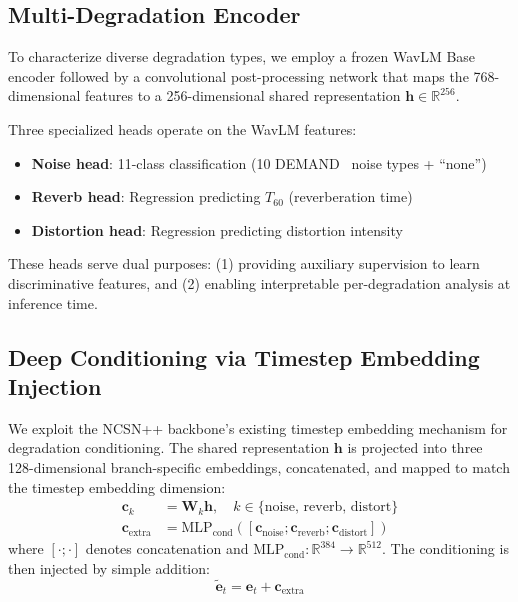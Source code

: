 \documentclass[cameraready]{Interspeech}
\begin{document}
\subsection{Multi-Degradation Encoder}

To characterize diverse degradation types, we employ a frozen WavLM Base~\cite{chen2022wavlm} encoder followed by a convolutional post-processing network that maps the 768-dimensional features to a 256-dimensional shared representation $\mathbf{h} \in \mathbb{R}^{256}$.

Three specialized heads operate on the WavLM features:
\begin{itemize}
\item \textbf{Noise head}: 11-class classification (10 DEMAND~\cite{thiemann2013demand} noise types + ``none'')
\item \textbf{Reverb head}: Regression predicting $T_{60}$ (reverberation time)
\item \textbf{Distortion head}: Regression predicting distortion intensity
\end{itemize}
These heads serve dual purposes: (1) providing auxiliary supervision to learn discriminative features, and (2) enabling interpretable per-degradation analysis at inference time.


\subsection{Deep Conditioning via Timestep Embedding Injection}

We exploit the NCSN++ backbone's existing timestep embedding mechanism for degradation conditioning.
The shared representation $\mathbf{h}$ is projected into three 128-dimensional branch-specific embeddings, concatenated, and mapped to match the timestep embedding dimension:
\begin{align}
\mathbf{c}_k &= \mathbf{W}_k \mathbf{h}, \quad k \in \{\text{noise, reverb, distort}\} \label{eq:branch} \\
\mathbf{c}_\text{extra} &= \text{MLP}_\text{cond}([\mathbf{c}_\text{noise}; \mathbf{c}_\text{reverb}; \mathbf{c}_\text{distort}]) \label{eq:mlp}
\end{align}
where $[\cdot;\cdot]$ denotes concatenation and $\text{MLP}_\text{cond}: \mathbb{R}^{384} \to \mathbb{R}^{512}$.
The conditioning is then injected by simple addition:
\begin{equation}
\tilde{\mathbf{e}}_t = \mathbf{e}_t + \mathbf{c}_\text{extra}
\label{eq:injection}
\end{equation}
\end{document}
